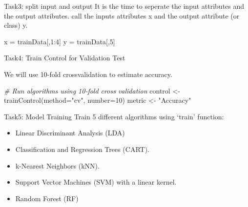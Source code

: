 \documentclass[
]{article}
\newenvironment{Shaded}{\begin{snugshade}}{\end{snugshade}}
\newcommand{\AttributeTok}[1]{\textcolor[rgb]{0.77,0.63,0.00}{#1}}
\newcommand{\CommentTok}[1]{\textcolor[rgb]{0.56,0.35,0.01}{\textit{#1}}}
\newcommand{\DecValTok}[1]{\textcolor[rgb]{0.00,0.00,0.81}{#1}}
\newcommand{\FunctionTok}[1]{\textcolor[rgb]{0.00,0.00,0.00}{#1}}
\newcommand{\NormalTok}[1]{#1}
\newcommand{\OtherTok}[1]{\textcolor[rgb]{0.56,0.35,0.01}{#1}}
\newcommand{\SpecialCharTok}[1]{\textcolor[rgb]{0.00,0.00,0.00}{#1}}
\newcommand{\StringTok}[1]{\textcolor[rgb]{0.31,0.60,0.02}{#1}}
\providecommand{\tightlist}{%
  \setlength{\itemsep}{0pt}\setlength{\parskip}{0pt}}
\begin{document}
Task3: split input and output It is the time to seperate the input
attributes and the output attributes. call the inputs attributes x and
the output attribute (or class) y.

\begin{Shaded}
\begin{Highlighting}[]
\NormalTok{x }\OtherTok{=}\NormalTok{ trainData[,}\DecValTok{1}\SpecialCharTok{:}\DecValTok{4}\NormalTok{]}
\NormalTok{y }\OtherTok{=}\NormalTok{ trainData[,}\DecValTok{5}\NormalTok{]}
\end{Highlighting}
\end{Shaded}

Task4: Train Control for Validation Test

We will use 10-fold crossvalidation to estimate accuracy.

\begin{Shaded}
\begin{Highlighting}[]
\CommentTok{\# Run algorithms using 10{-}fold cross validation}
\NormalTok{control }\OtherTok{\textless{}{-}} \FunctionTok{trainControl}\NormalTok{(}\AttributeTok{method=}\StringTok{"cv"}\NormalTok{, }\AttributeTok{number=}\DecValTok{10}\NormalTok{)}
\NormalTok{metric }\OtherTok{\textless{}{-}} \StringTok{"Accuracy"}
\end{Highlighting}
\end{Shaded}

Task5: Model Training Train 5 different algorithms using `train'
function:

\begin{itemize}
\tightlist
\item
  Linear Discriminant Analysis (LDA)
\item
  Classification and Regression Trees (CART).
\item
  k-Nearest Neighbors (kNN).
\item
  Support Vector Machines (SVM) with a linear kernel.
\item
  Random Forest (RF)
\end{itemize}
\end{document}
